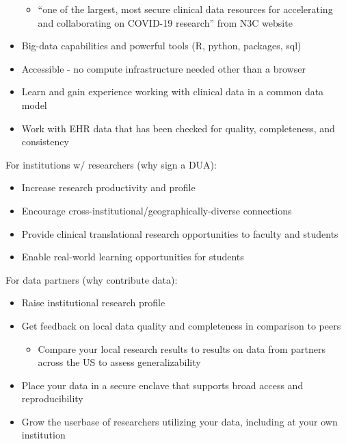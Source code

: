 \documentclass[
  letterpaper,
  DIV=11,
  numbers=noendperiod]{scrreprt}
\providecommand{\tightlist}{%
  \setlength{\itemsep}{0pt}\setlength{\parskip}{0pt}}\usepackage{longtable,booktabs,array}
\begin{document}
\begin{itemize}
  \begin{itemize}
  \tightlist
  \item
    ``one of the largest, most secure clinical data resources for
    accelerating and collaborating on COVID-19 research'' from N3C
    website
  \end{itemize}
\item
  Big-data capabilities and powerful tools (R, python, packages, sql)
\item
  Accessible - no compute infrastructure needed other than a browser
\item
  Learn and gain experience working with clinical data in a common data
  model
\item
  Work with EHR data that has been checked for quality, completeness,
  and consistency
\end{itemize}

For institutions w/ researchers (why sign a DUA):

\begin{itemize}
\tightlist
\item
  Increase research productivity and profile
\item
  Encourage cross-institutional/geographically-diverse connections
\item
  Provide clinical translational research opportunities to faculty and
  students
\item
  Enable real-world learning opportunities for students\\
\end{itemize}

For data partners (why contribute data):

\begin{itemize}
\tightlist
\item
  Raise institutional research profile
\item
  Get feedback on local data quality and completeness in comparison to
  peers

  \begin{itemize}
  \tightlist
  \item
    Compare your local research results to results on data from partners
    across the US to assess generalizability
  \end{itemize}
\item
  Place your data in a secure enclave that supports broad access and
  reproducibility
\item
  Grow the userbase of researchers utilizing your data, including at
  your own institution
\end{itemize}
\end{document}
